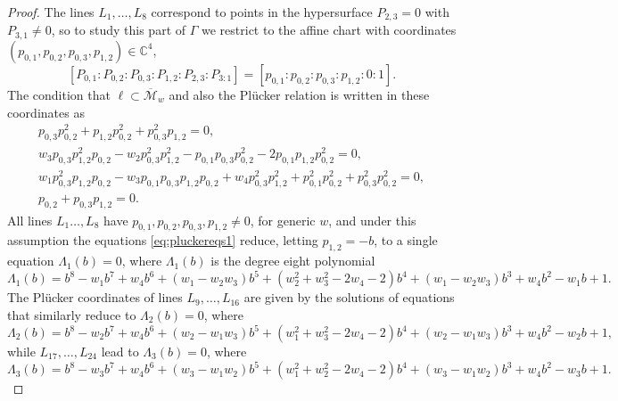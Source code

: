 \documentclass[a4paper,reqno]{amsart}
\numberwithin{equation}{section}
\newcommand{\C}{\mathbb{C}}
\numberwithin{equation}{section}
\begin{document}
\begin{proof}
The lines $L_1,\dots,L_8$ correspond to points in the hypersurface $P_{2,3}=0$ with $P_{3,1}\neq0$, so to study this part of $\Gamma$ we restrict to the affine chart with coordinates $(p_{0,1},p_{0,2},p_{0,3},p_{1,2})\in\C^4$, 
$$[P_{0,1}:P_{0,2}:P_{0,3}:P_{1,2}:P_{2,3}:P_{3:1}] = [p_{0,1}:p_{0,2}:p_{0,3}:p_{1,2}:0:1].$$
The condition that $\ell\subset \overline{\mathcal{M}}_w$ and also the Pl\"ucker relation is written in these coordinates as
\begin{equation} \label{eq:pluckereqs1}
    \begin{gathered}
        p_{0,3} p_{0,2}^2+p_{1,2} p_{0,2}^2+p_{0,3}^2 p_{1,2} =0, \\
        w_3 p_{0,3} p_{1,2}^2 p_{0,2}-w_2 p_{0,3}^2 p_{1,2}^2-p_{0,1} p_{0,3} p_{0,2}^2-2 p_{0,1} p_{1,2} p_{0,2}^2=0,\\
        w_1 p_{0,3}^2 p_{1,2} p_{0,2}-w_3 p_{0,1} p_{0,3} p_{1,2} p_{0,2}+w_4 p_{0,3}^2 p_{1,2}^2+p_{0,1}^2 p_{0,2}^2+p_{0,3}^2 p_{0,2}^2=0,\\
        p_{0,2}+p_{0,3} p_{1,2} = 0.
    \end{gathered}
\end{equation}
All lines $L_1\dots,L_8$ have $p_{0,1},p_{0,2},p_{0,3},p_{1,2}\neq 0$, for generic $w$, and under this assumption the equations \eqref{eq:pluckereqs1} reduce, letting $p_{1,2}=-b$, to a single equation $\Lambda_1(b)=0$, where $\Lambda_1(b)$ is the degree eight polynomial
\begin{equation} \label{pvi:Lambda1}
    \Lambda_1(b)= b^8-w_1b^7 +w_4 b^6 + (w_1- w_2 w_3) b^5+ (w_2^2 +w_3^2-2w_4-2) b^4 +(w_1- w_2 w_3)b^3+ w_4 b^2- w_1 b+1.
\end{equation}
The Pl\"ucker coordinates of lines $L_9,\dots,L_{16}$ are given by the solutions of equations that similarly reduce to $\Lambda_2(b)=0$, where 
\begin{equation} \label{pvi:Lambda2}
    \Lambda_2(b)= b^8-w_2b^7 +w_4b^6 + (w_2 - w_1 w_3) b^5+(w_1^2+ w_3^2-2w_4-2)b^4+(w_2- w_1 w_3)b^3+ w_4 b^2 - w_2 b+1,
\end{equation}
while $L_{17},\dots,L_{24}$ lead to $\Lambda_3(b)=0$, where 
\begin{equation} \label{pvi:Lambda3}
    \Lambda_3(b)= b^8-w_3b^7 + w_4 b^6+ (w_3  - w_1 w_2) b^5+( w_1^2+ w_2^2-2  w_4-2)b^4 +(  w_3-w_1 w_2)b^3+ w_4 b^2 - w_3b+1.
\end{equation}


\end{proof}
\end{document}
